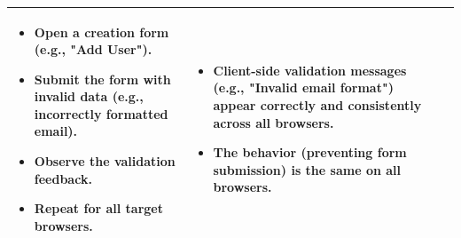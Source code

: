 \documentclass[10pt, a4paper]{report}
\begin{document}
\begin{longtable}{|>{\raggedright\arraybackslash}p{3cm}|>{\raggedright\arraybackslash}p{4.5cm}|>{\raggedright\arraybackslash}p{4.5cm}|>{\raggedright\arraybackslash}p{5.5cm}|}
    \begin{itemize}[noitemsep, topsep=0pt, partopsep=0pt, leftmargin=*]
        \item Open a creation form (e.g., "Add User").
        \item Submit the form with invalid data (e.g., incorrectly formatted email).
        \item Observe the validation feedback.
        \item Repeat for all target browsers.
    \end{itemize} & 
    \begin{itemize}[noitemsep, topsep=0pt, partopsep=0pt, leftmargin=*]
        \item Client-side validation messages (e.g., "Invalid email format") appear correctly and consistently across all browsers.
        \item The behavior (preventing form submission) is the same on all browsers.
    \end{itemize} \\ \hline


\end{longtable}
\end{document}
